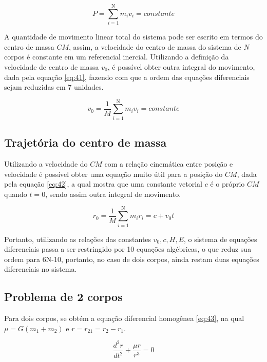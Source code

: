 \begin{equation}
    P = \sum\limits_{i=1}^{\mbox{N}} m_{i}v_{i} = constante
    \label{eq:40}
\end{equation}

A quantidade de movimento linear total do sistema pode ser escrito em termos do centro de massa $CM$, assim, a velocidade do centro de massa do sistema de $N$ corpos é constante em um referencial inercial. Utilizando a definição da velocidade de centro de massa $v_{0}$, é possível obter outra integral do movimento, dada pela equação \ref{eq:41}, fazendo com que a ordem das equações diferenciais sejam reduzidas em 7 unidades.

\begin{equation}
    v_{0} = \frac{1}{M} \sum\limits_{i=1}^{\mbox{N}} m_{i}v_{i} = constante
    \label{eq:41}
\end{equation}

\subsection{Trajetória do centro de massa }

Utilizando a velocidade do $CM$ com a relação cinemática entre posição e velocidade é possível obter uma equação muito útil para a posição do $CM$, dada pela equação \ref{eq:42}, a qual mostra que uma constante vetorial $c$ é o próprio $CM$ quando $t = 0$, sendo assim outra integral de movimento. 

\begin{equation}
    r_{0} = \frac{1}{M} \sum\limits_{i=1}^{\mbox{N}} m_{i}r_{i} = c+v_{0}t
\label{eq:42}
\end{equation}

Portanto, utilizando as relações das constantes $v_{0}, c, H, E$, o sistema de equações diferenciais passa a ser restringido por 10 equações algébricas, o que reduz sua ordem para 6N-10, portanto, no caso de dois corpos, ainda restam duas equações diferenciais no sistema. 

\subsection{Problema de 2 corpos}

Para dois corpos, se obtém a equação diferencial homogênea \ref{eq:43}, na qual $\mu = G(m_{1} + m_{2})$ e $r = r_{21} = r_{2} - r_{1}$.

\begin{equation}
    \frac{d^{2} r}{dt^{2}} + \frac{\mu r}{r^{3}} = 0
    \label{eq:43}
\end{equation}

